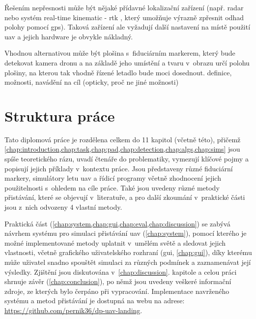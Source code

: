 Řešením nepřesnosti může být nějaké přídavné lokalizační zařízení (např. radar nebo systém real-time kinematic - \acrshort{rtk} \cite{rtk}, který umožňuje výrazně zpřesnit odhad polohy pomocí \acrshort{gps}). Taková zařízení ale vyžadují další nastavení na místě použití \acrshort{uav} a jejich hardware je obvykle nákladný.

Vhodnou alternativou může být plošina s~fiduciárním markerem, který bude detekovat kamera dronu a na základě jeho umístění a tvaru v~obrazu určí polohu plošiny, na kterou tak vhodně řízené letadlo bude moci dosednout.
definice, možnosti, navádění na cíl (opticky, proč ne jiné možnosti)
\section{Struktura práce}
Tato diplomová práce je rozdělena celkem do 11 kapitol (včetně této), přičemž \cref{chap:introduction,chap:task,chap:pad,chap:detection,chap:algs,chap:sims} jsou spíše teoretického rázu, uvadí čtenáře do problematiky, vymezují klíčové pojmy a popisují jejich příklady v~kontextu práce. Jsou představeny různé fiduciární markery, simulátory letu \acrshort{uav} a řídicí programy včetně zhodnocení jejich použitelnosti s~ohledem na cíle práce. Také jsou uvedeny různé metody přistávání, které se objevují v~literatuře, a pro další zkoumání v~praktické části jsou z~nich odvozeny 4 vlastní metody.

Praktická část (\cref{chap:system,chap:gui,chap:eval,chap:discussion}) se zabývá návrhem systému pro simulaci přistávání \acrshort{uav} (\cref{chap:system}), pomocí kterého je možné implementované metody uplatnit v~umělém světě a sledovat jejich vlastnosti, včetně grafického uživatelského rozhraní (\acrshort{gui}, \cref{chap:gui}), díky kterému může uživatel snadno spouštět simulaci za různých podmínek a zaznamenávat její výsledky. Zjištění jsou diskutována v~\cref*{chap:discussion}. kapitole a celou práci shrnuje závěr (\cref{chap:conclusion}), po němž jsou uvedeny veškeré informační zdroje, ze kterých bylo čerpáno při vypracování. Implementace navrženého systému a metod přistávání je dostupná na webu na adrese: \url{https://github.com/pernik36/dp-uav-landing}.